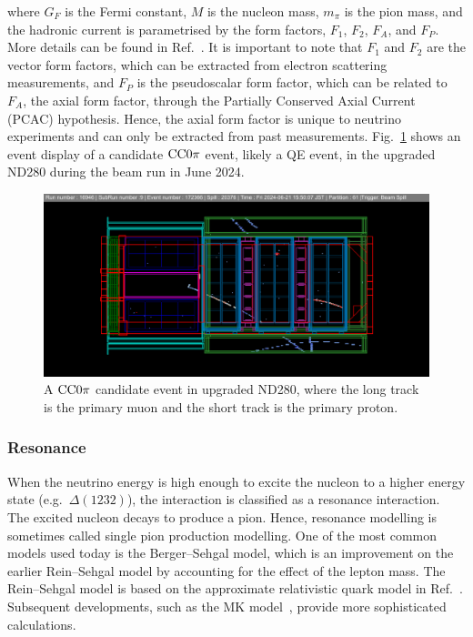 where $G_F$ is the Fermi constant, $M$ is the nucleon mass, $m_\pi$ is the pion mass, and the hadronic current is parametrised by the form factors, $F_1$, $F_2$, $F_A$, and $F_P$.
More details can be found in Ref.~\cite{LlewellynSmith:1978te}.
It is important to note that $F_1$ and $F_2$ are the vector form factors, which can be extracted from electron scattering measurements, and $F_P$ is the pseudoscalar form factor, which can be related to $F_A$, the axial form factor, through the Partially Conserved Axial Current (PCAC) hypothesis.
Hence, the axial form factor is unique to neutrino experiments and can only be extracted from past measurements.
Fig.~\ref{fig:cc0pi} shows an event display of a candidate $\textrm{CC}0\pi$ event, likely a QE event, in the upgraded ND280 during the beam run in June 2024.

\begin{figure}[!htb] 	
    \centering 		
    \includegraphics[width=\sgfigwid\textwidth]{figures/cc0pi.png}
    \caption{\label{fig:cc0pi} A $\textrm{CC}0\pi$ candidate event in upgraded ND280, where the long track is the primary muon and the short track is the primary proton.} 
\end{figure}

\subsubsection{Resonance}
When the neutrino energy is high enough to excite the nucleon to a higher energy state (e.g.\ $\Delta(1232)$), the interaction is classified as a resonance interaction.
The excited nucleon decays to produce a pion. 
Hence, resonance modelling is sometimes called single pion production modelling.
One of the most common models used today is the Berger–Sehgal model, which is an improvement on the earlier Rein–Sehgal model by accounting for the effect of the lepton mass.
The Rein–Sehgal model is based on the approximate relativistic quark model in Ref.~\cite{Feynman:1971wr}.
Subsequent developments, such as the MK model~\cite{Kabirnezhad:2017jmf,Kabirnezhad:2020wtp,Kabirnezhad:2022znc}, provide more sophisticated calculations.

